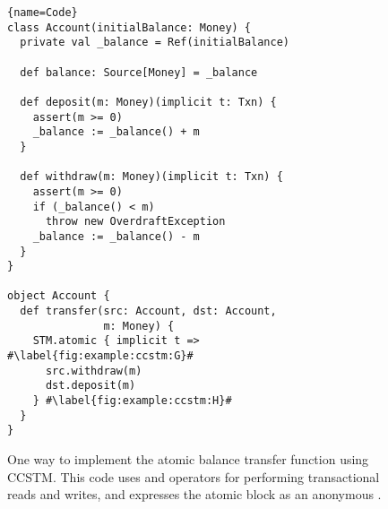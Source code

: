 \begin{figure}
\begin{lstlisting}{name=Code}
class Account(initialBalance: Money) {
  private val _balance = Ref(initialBalance)

  def balance: Source[Money] = _balance

  def deposit(m: Money)(implicit t: Txn) {
    assert(m >= 0)
    _balance := _balance() + m
  }

  def withdraw(m: Money)(implicit t: Txn) {
    assert(m >= 0)
    if (_balance() < m)
      throw new OverdraftException
    _balance := _balance() - m
  }
}

object Account {
  def transfer(src: Account, dst: Account,
               m: Money) {
    STM.atomic { implicit t => #\label{fig:example:ccstm:G}#
      src.withdraw(m)
      dst.deposit(m)
    } #\label{fig:example:ccstm:H}#
  }
}
\end{lstlisting}

\caption{One way to implement the atomic balance transfer function
using CCSTM.  This code uses  and \code{:=} operators
for performing transactional reads and writes, and expresses the atomic
block as an anonymous .}

\label{fig:example:ccstm}
\end{figure}
